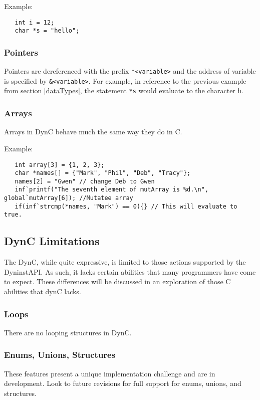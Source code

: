 \documentclass{article}
\begin{document}
\noindent Example:
\begin{lstlisting}
   int i = 12;
   char *s = "hello";
\end{lstlisting}

\subsubsection{Pointers}
Pointers are dereferenced with the prefix \verb!*<variable>! and the address of variable is specified by \verb!&<variable>!.
For example, in reference to the previous example from section \ref{dataTypes}, the statement \verb!*s! would evaluate to the character \verb!h!.

\subsubsection{Arrays}
Arrays in DynC behave much the same way they do in C. 

\noindent Example:
\begin{lstlisting}
   int array[3] = {1, 2, 3};
   char *names[] = {"Mark", "Phil", "Deb", "Tracy"};
   names[2] = "Gwen" // change Deb to Gwen
   inf`printf("The seventh element of mutArray is %d.\n", global`mutArray[6]); //Mutatee array 
   if(inf`strcmp(*names, "Mark") == 0){} // This will evaluate to true. 
\end{lstlisting}

\subsection{DynC Limitations}
The DynC, while quite expressive, is limited to those actions supported by the DyninstAPI. As such, it lacks certain abilities that many programmers have come to expect. These differences will be discussed in an exploration of those C abilities that dynC lacks.
 
\subsubsection{Loops}
There are no looping structures in DynC.

\subsubsection{Enums, Unions, Structures}
These features present a unique implementation challenge and are in development. Look to future revisions for full support for enums, unions, and structures.
\end{document}

